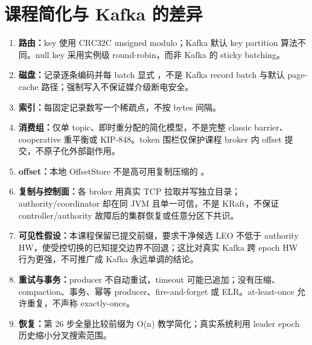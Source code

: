 \section{课程简化与 Kafka 的差异}
\begin{enumerate}
\item \textbf{路由：}key 使用 CRC32C unsigned modulo；Kafka 默认 key partition 算法不同。null key 采用实例级 round-robin，而非 Kafka 的 sticky batching。
\item \textbf{磁盘：}记录逐条编码并每 batch 显式 ，不是 Kafka record batch 与默认 page-cache 路径；强制写入不保证媒介级断电安全。
\item \textbf{索引：}每固定记录数写一个稀疏点，不按 bytes 间隔。
\item \textbf{消费组：}仅单 topic、即时重分配的简化模型，不是完整 classic barrier、cooperative 重平衡或 KIP-848。token 围栏仅保护课程 broker 内 offset 提交，不原子化外部副作用。
\item \textbf{offset：}本地 OffsetStore 不是高可用复制压缩的 。
\item \textbf{复制与控制面：}各 broker 用真实 TCP 拉取并写独立目录；authority/coordinator 却在同 JVM 且单一可信，不是 KRaft，不保证 controller/authority 故障后的集群恢复或任意分区下共识。
\item \textbf{可见性假设：}本课程保留已提交前缀，要求干净候选 LEO 不低于 authority HW，使受控切换的已知提交边界不回退；这比对真实 Kafka 跨 epoch HW 行为更强，不可推广成 Kafka 永远单调的结论。
\item \textbf{重试与事务：}producer 不自动重试，timeout 可能已追加；没有压缩、compaction、事务、幂等 producer、fire-and-forget 或 ELR。at-least-once 允许重复，不声称 exactly-once。
\item \textbf{恢复：}第 26 步全量比较前缀为 O(n) 教学简化；真实系统利用 leader epoch 历史缩小分叉搜索范围。
\end{enumerate}

